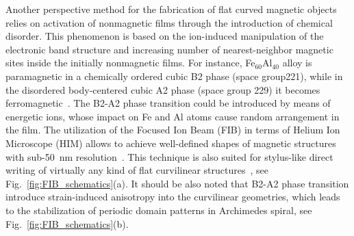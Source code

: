 Another perspective method for the fabrication of flat curved magnetic objects relies on activation of nonmagnetic films through the introduction of chemical disorder. This phenomenon is based on the ion-induced manipulation of the electronic band structure and increasing number of nearest-neighbor magnetic sites inside the initially nonmagnetic films. For instance, Fe$_60$Al$_40$ alloy is paramagnetic in a chemically ordered cubic B2 phase (space group221), while in the disordered body-centered cubic A2 phase (space group 229) it becomes ferromagnetic~\cite{Fassbender08,Bali14}. The B2-A2 phase transition could be introduced by means of energetic ions, whose impact on Fe and Al atoms cause random arrangement in the film. The utilization of the Focused Ion Beam (FIB) in terms of Helium Ion Microscope (HIM) allows to achieve well-defined shapes of magnetic structures with sub-50~nm resolution~\cite{Bali14}. This technique is also suited for stylus-like direct writing of virtually any kind of flat curvilinear structures~\cite{Nord19}, see Fig.~\ref{fig:FIB_schematics}(a). It should be also noted that B2-A2 phase transition introduce strain-induced anisotropy into the curvilinear geometries, which leads to the stabilization of periodic domain patterns in Archimedes spiral, see Fig.~\ref{fig:FIB_schematics}(b). 


